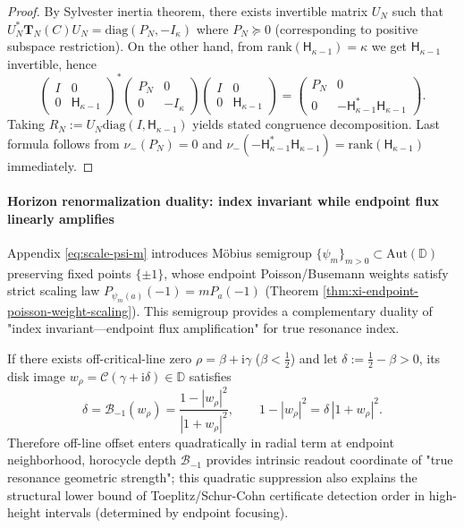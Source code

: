 \begin{proof}
By Sylvester inertia theorem, there exists invertible matrix \(U_N\) such that
\(
U_N^\ast\mathbf{T}_N(C)U_N=\mathrm{diag}(P_N,-I_{\kappa})
\)
where \(P_N\succeq 0\) (corresponding to positive subspace restriction).
On the other hand, from \(\mathrm{rank}(\mathsf H_{\kappa-1})=\kappa\) we get \(\mathsf H_{\kappa-1}\) invertible, hence
\[
\begin{pmatrix} I & 0\\ 0 & \mathsf H_{\kappa-1}\end{pmatrix}^{\!\ast}
\begin{pmatrix} P_N & 0\\ 0 & -I_{\kappa}\end{pmatrix}
\begin{pmatrix} I & 0\\ 0 & \mathsf H_{\kappa-1}\end{pmatrix}
=
\begin{pmatrix} P_N & 0\\ 0 & -\mathsf H_{\kappa-1}^{\ast}\mathsf H_{\kappa-1}\end{pmatrix}.
\]
Taking \(R_N:=U_N\mathrm{diag}(I,\mathsf H_{\kappa-1})\) yields stated congruence decomposition.
Last formula follows from \(\nu_-(P_N)=0\) and \(\nu_-( -\mathsf H_{\kappa-1}^{\ast}\mathsf H_{\kappa-1})=\mathrm{rank}(\mathsf H_{\kappa-1})\) immediately.
\end{proof}

\paragraph{Horizon renormalization duality: index invariant while endpoint flux linearly amplifies}
Appendix \eqref{eq:scale-psi-m} introduces Möbius semigroup \(\{\psi_m\}_{m>0}\subset\mathrm{Aut}(\mathbb{D})\) preserving fixed points \(\{\pm 1\}\), whose endpoint Poisson/Busemann weights satisfy strict scaling law \(P_{\psi_m(a)}(-1)=mP_a(-1)\) (Theorem \ref{thm:xi-endpoint-poisson-weight-scaling}).
This semigroup provides a complementary duality of "index invariant—endpoint flux amplification" for true resonance index.

\begin{theorem}\label{thm:xi-horocycle-depth-quadratic-suppression}
If there exists off-critical-line zero \(\rho=\beta+\mathrm{i}\gamma\) (\(\beta<\tfrac12\)) and let \(\delta:=\tfrac12-\beta>0\), its disk image \(w_\rho=\mathcal{C}(\gamma+\mathrm{i}\delta)\in\mathbb{D}\) satisfies
\[
\boxed{\;
\delta=\mathcal{B}_{-1}(w_\rho)=\frac{1-|w_\rho|^2}{|1+w_\rho|^2},\qquad
1-|w_\rho|^2=\delta\,|1+w_\rho|^2.\;}
\]
Therefore off-line offset enters quadratically in radial term at endpoint neighborhood, horocycle depth \(\mathcal{B}_{-1}\) provides intrinsic readout coordinate of "true resonance geometric strength";
this quadratic suppression also explains the structural lower bound of Toeplitz/Schur-Cohn certificate detection order in high-height intervals (determined by endpoint focusing).
\end{theorem}

